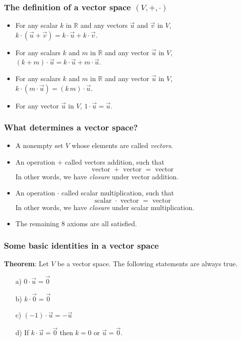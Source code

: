 \begin{frame}[fragile]
\frametitle{The definition of a vector space $(V, +, \cdot)$}
\begin{itemize}
\item For any scalar $k$ in $\mathbb{R}$ and any vectors $\vec{u}$ and $ \vec{v}$ in $V$, $k \cdot (\vec{u} + \vec{v}) = k \cdot \vec{u} + k \cdot \vec{v}$.
\item For any scalars $k$ and $m$ in $\mathbb{R}$ and any vector $\vec{u}$ in $V$, $(k + m) \cdot \vec{u} = k \cdot \vec{u} + m \cdot \vec{u}$.
\item For any scalars $k$ and $m$ in $\mathbb{R}$ and any vector $\vec{u}$ in $V$, $k \cdot (m \cdot \vec{u}) = (k \, m) \cdot \vec{u}$.
\item For any vector $\vec{u}$ in $V$, $1 \cdot \vec{u} = \vec{u}$.
\end{itemize}
\end{frame}


\begin{frame}[fragile]
\frametitle{What determines a vector space?}

\begin{itemize}
\item A nonempty set $V$ whose elements are called {\em vectors}.
\item An operation $+$ called vectors addition, such that $$ \text{ vector } + \text{ vector } = \text{ vector }$$ 
In other words, we have {\em closure} under vector addition.
\item An operation $\cdot$ called scalar multiplication, such that $$ \text{ scalar } \cdot \text{ vector } = \text{ vector }$$ 
In other words, we have {\em closure} under scalar multiplication.
\item The remaining 8 axioms are all satisfied. 
\end{itemize}
\end{frame}

\begin{frame}[fragile]
\frametitle{Some basic identities in a vector space}

\textbf{Theorem}: Let $V$ be a vector space. The following statements are always true.

\begin{itemize}
\item[a)] $\displaystyle 0 \cdot \vec{u} = \vec{0}$

\item[b)] $\displaystyle k \cdot \vec{0} = \vec{0}$

\item[c)] $\displaystyle (-1) \cdot \vec{u} = - \vec{u}$

\item[d)] If $\displaystyle k \cdot \vec{u} = \vec{0}$ then $k=0$ or $\vec{u} = \vec{0}$.

\end{itemize}

\end{frame}


